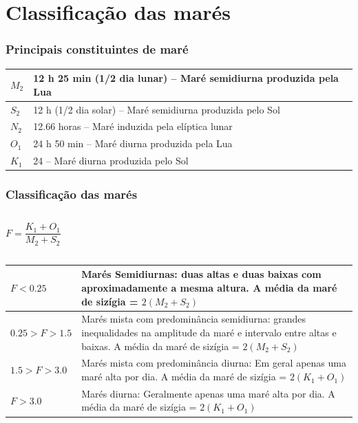 \section{Classificação das marés}
\begin{frame}
  \frametitle{Principais constituintes de maré}
  \footnotesize{
\begin{table}
    \begin{tabular}{|l|l|}
        \hline
        $M_2$ & 12 h 25 min (1/2 dia lunar) -- Maré semidiurna produzida pela Lua \\ \hline
        $S_2$ & 12 h (1/2 dia solar) -- Maré semidiurna produzida pelo Sol        \\ \hline
        $N_2$ & 12.66 horas -- Maré induzida pela elíptica lunar                  \\ \hline
        $O_1$ & 24 h 50 min -- Maré diurna produzida pela Lua                     \\ \hline
        $K_1$ & 24 -- Maré diurna produzida pelo Sol                              \\
        \hline
    \end{tabular}
\end{table}
}
\end{frame}

\begin{frame}
  \frametitle{Classificação das marés}
    \begin{columns}
    \column{4cm}
    \begin{block}{}
      \[ F = \frac{K_1 + O_1}{M_2 + S_2} \]
    \end{block}
    \end{columns}
\scriptsize{
\begin{table}
    \begin{tabular}{|l|p{9cm}|}
        \hline
        $F < 0.25$       & \parbox{9cm}{Marés Semidiurnas: duas altas e duas baixas com aproximadamente a mesma altura.  A média da maré de sizígia = $2(M_2 + S_2)$} \\ \hline
        $0.25 > F > 1.5$ & \parbox{9cm}{Marés mista com predominância semidiurna: grandes inequalidades na amplitude da maré e intervalo entre altas e baixas.  A média da maré de sizígia = $2(M_2 + S_2)$} \\ \hline
        $1.5 > F > 3.0$  & \parbox{9cm}{Marés mista com predominância diurna: Em geral apenas uma maré alta por dia.  A média da maré de sizígia = $2(K_1 + O_1)$}                                           \\ \hline
        $F > 3.0$        & \parbox{9cm}{Marés diurna: Geralmente apenas uma maré alta por dia. A média da maré de sizígia = $2(K_1 + O_1)$}                                                                 \\ \hline
    \end{tabular}
\end{table}
}
\end{frame}


